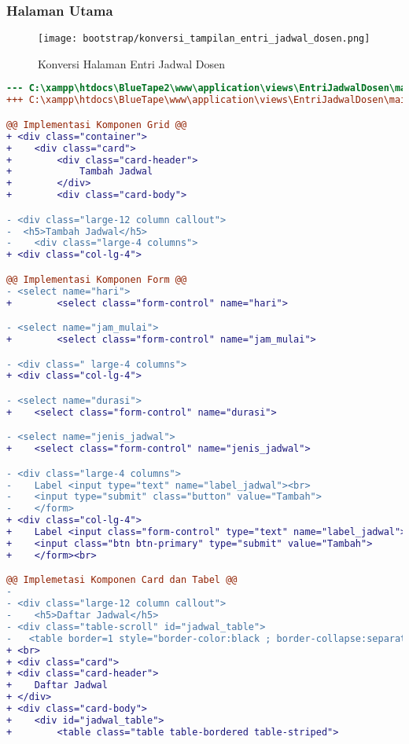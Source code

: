 \subsubsection{Halaman Utama}
\begin{figure} [H]
	\centering  
	\texttt{[image: bootstrap/konversi\_tampilan\_entri\_jadwal\_dosen.png]}
	\caption{Konversi Halaman Entri Jadwal Dosen}
\end{figure}
\begin{lstlisting}[language=diff, caption=Kode untuk Halaman Entri Jadwal Dosen, label=Entri, basicstyle=\ttfamily, frame=single,
columns=fullflexible, keepspaces=true, breaklines=true]
--- C:\xampp\htdocs\BlueTape2\www\application\views\EntriJadwalDosen\main.php
+++ C:\xampp\htdocs\BlueTape\www\application\views\EntriJadwalDosen\main.php

@@ Implementasi Komponen Grid @@
+ <div class="container">
+    <div class="card">
+        <div class="card-header">
+            Tambah Jadwal
+        </div>
+        <div class="card-body">

- <div class="large-12 column callout">
-  <h5>Tambah Jadwal</h5>
-    <div class="large-4 columns">
+ <div class="col-lg-4">

@@ Implementasi Komponen Form @@
- <select name="hari"> 
+        <select class="form-control" name="hari">

- <select name="jam_mulai"> 
+        <select class="form-control" name="jam_mulai">

- <div class=" large-4 columns">
+ <div class="col-lg-4">

- <select name="durasi"> 
+    <select class="form-control" name="durasi">

- <select name="jenis_jadwal"> 
+    <select class="form-control" name="jenis_jadwal">

- <div class="large-4 columns">
-    Label <input type="text" name="label_jadwal"><br>
-    <input type="submit" class="button" value="Tambah">
-    </form>
+ <div class="col-lg-4">
+    Label <input class="form-control" type="text" name="label_jadwal"><br><br>
+    <input class="btn btn-primary" type="submit" value="Tambah">
+    </form><br>

@@ Implemetasi Komponen Card dan Tabel @@
-
- <div class="large-12 column callout">
-    <h5>Daftar Jadwal</h5>
- <div class="table-scroll" id="jadwal_table">
-	<table border=1 style="border-color:black ; border-collapse:separate">
+ <br>
+ <div class="card">
+ <div class="card-header">
+    Daftar Jadwal
+ </div>
+ <div class="card-body">
+    <div id="jadwal_table">
+        <table class="table table-bordered table-striped">


\end{lstlisting}
